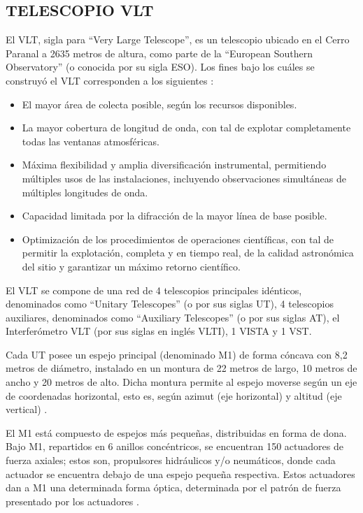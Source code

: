 
\subsection{TELESCOPIO VLT}
El VLT, sigla para “Very Large Telescope”, es un telescopio ubicado en el Cerro Paranal a 2635 metros de altura, como parte de la “European Southern Observatory” (o conocida por su sigla ESO). 
Los fines bajo los cuáles se construyó el VLT corresponden a los siguientes \cite{eso1998vlt}:
\begin{itemize}

    \item El mayor área de colecta posible, según los recursos disponibles.
    \item La mayor cobertura de longitud de onda, con tal de explotar completamente todas las ventanas atmosféricas.
    \item Máxima flexibilidad y amplia diversificación instrumental, permitiendo múltiples usos de las instalaciones, incluyendo observaciones simultáneas de múltiples longitudes de onda.
    \item Capacidad limitada por la difracción de la mayor línea de base posible.
    \item Optimización de los procedimientos de operaciones científicas, con tal de permitir la explotación, completa y en tiempo real, de la calidad astronómica del sitio y garantizar un máximo retorno científico.

\end{itemize}

El VLT se compone de una red de 4 telescopios principales idénticos, denominados como “Unitary Telescopes” (o por sus siglas UT), 4 telescopios auxiliares, denominados como “Auxiliary Telescopes” (o por sus siglas AT), el  Interferómetro VLT (por sus siglas en inglés VLTI), 1 VISTA y 1 VST.

Cada UT posee un espejo principal (denominado M1) de forma cóncava con 8,2 metros de diámetro, instalado en un montura de 22 metros de largo, 10 metros de ancho y 20 metros de alto. Dicha montura permite al espejo moverse según un eje de coordenadas horizontal, esto es, según azimut (eje horizontal) y altitud (eje vertical) \cite{eso1998vlt}.

El M1 está compuesto de espejos más pequeñas, distribuidas en forma de dona. Bajo M1, repartidos en 6 anillos concéntricos, se encuentran 150 actuadores de fuerza axiales; estos son, propulsores hidráulicos y/o neumáticos, donde cada actuador se encuentra debajo de una espejo pequeña respectiva. Estos actuadores dan a M1 una determinada forma óptica, determinada por el patrón de fuerza presentado por los actuadores \cite{eso1998vlt}.

